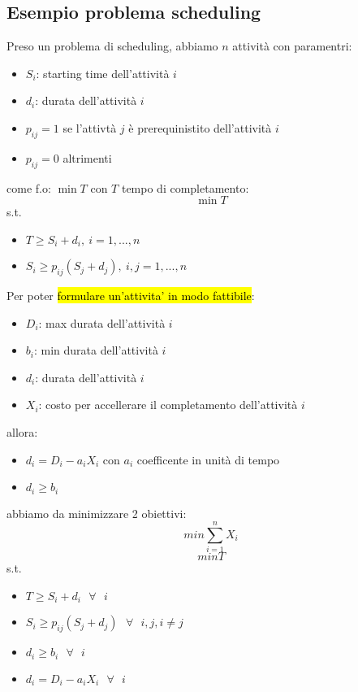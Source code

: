 \subsection{Esempio problema scheduling}

Preso un problema di scheduling, abbiamo $n$ attività con paramentri:

\begin{itemize}
    \item $S_i$: starting time dell'attività $i$
    \item $d_i$: durata dell'attività $i$
    \item $p_{ij} = 1$ se l'attivtà $j$ è prerequinistito dell'attività $i$
    \item $p_{ij} = 0$ altrimenti
\end{itemize}

come f.o: $\min T$ con $T$ tempo di completamento:
$$\min T$$
s.t.

\begin{itemize}
    \item $T \geq S_i + d_i,\ i = 1, ..., n$
    \item $S_i \geq p_{ij} (S_j + d_j),\ i,j = 1, ..., n$
\end{itemize}

Per poter \hl{formulare un'attivita' in modo fattibile}:

\begin{itemize}
    \item $D_i$: max durata dell'attività $i$
    \item $b_i$: min durata dell'attività $i$
    \item $d_i$: durata dell'attività $i$
    \item $X_i$: costo per accellerare il completamento dell'attività $i$
\end{itemize}


allora:

\begin{itemize}
    \item $d_i = D_i-a_iX_i$ con $a_i$ coefficente in unità di tempo
    \item $d_i \geq b_i$
\end{itemize}

abbiamo da minimizzare 2 obiettivi:
$$min \sum_{i=1}^n X_i$$
$$min T$$
s.t.

\begin{itemize}
    \item $T \geq S_i + d_i\ \ \ \forall\ \ \ i$
    \item $S_i \geq p_{ij} (S_j + d_j)\ \ \ \forall\ \ \ i, j, i \neq j$
    \item $d_i \geq b_i\ \ \ \forall\ \ \ i$
    \item $d_i = D_i - a_i X_i\ \ \ \forall\ \ \ i$
\end{itemize}


